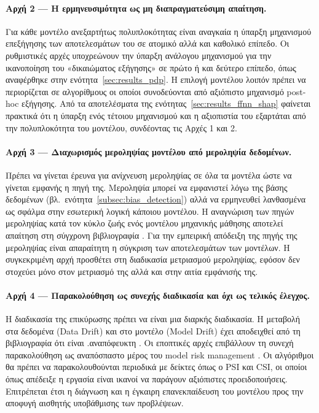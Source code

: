 \paragraph{Αρχή 2 --- Η ερμηνευσιμότητα ως μη διαπραγματεύσιμη απαίτηση.}
Για κάθε μοντέλο ανεξαρτήτως πολυπλοκότητας είναι αναγκαία η
ύπαρξη μηχανισμού επεξήγησης των αποτελεσμάτων του σε ατομικό
αλλά και καθολικό επίπεδο. Οι ρυθμιστικές αρχές υποχρεώνουν
την ύπαρξη ανάλογου μηχανισμού για την ικανοποίηση του
«δικαιώματος εξήγησης» \citep{goodman2017european, eba2023} σε πρώτο ή και δεύτερο επίπεδο, όπως
αναφέρθηκε στην ενότητα~\ref{sec:results_pdp}. Η επιλογή
μοντέλου λοιπόν πρέπει να περιορίζεται σε αλγορίθμους οι οποίοι
συνοδεύονται από αξιόπιστο μηχανισμό post-hoc εξήγησης. Από τα
αποτελέσματα της ενότητας~\ref{sec:results_ffnn_shap} φαίνεται
πρακτικά ότι η ύπαρξη ενός τέτοιου μηχανισμού και η αξιοπιστία
του εξαρτάται από την πολυπλοκότητα του μοντέλου, συνδέοντας
τις Αρχές 1 και 2.

\paragraph{Αρχή 3 --- Διαχωρισμός μεροληψίας μοντέλου από μεροληψία δεδομένων.}
Πρέπει να γίνεται έρευνα για ανίχνευση μεροληψίας σε όλα τα
μοντέλα ώστε να γίνεται εμφανής η πηγή της. Μεροληψία μπορεί
να εμφανιστεί λόγω της βάσης δεδομένων
(βλ.\ ενότητα~\ref{subsec:bias_detection}) αλλά να ερμηνευθεί
λανθασμένα ως σφάλμα στην εσωτερική λογική κάποιου μοντέλου.
Η αναγνώριση των πηγών μεροληψίας κατά τον κύκλο ζωής ενός μοντέλου μηχανικής μάθησης 
αποτελεί απαίτηση στη σύγχρονη βιβλιογραφία \citep{mehrabi2021survey, suresh2021framework}.
Για την εμπειρική απόδειξη της πηγής της μεροληψίας είναι
απαραίτητη η σύγκριση των αποτελεσμάτων των μοντέλων. Η
συγκεκριμένη αρχή προσθέτει στη διαδικασία μετριασμού
μεροληψίας, εφόσον δεν στοχεύει μόνο στον μετριασμό της αλλά
και στην αιτία εμφάνισής της.

\paragraph{Αρχή 4 --- Παρακολούθηση ως συνεχής διαδικασία και όχι ως τελικός έλεγχος.}
Η διαδικασία της επικύρωσης πρέπει να είναι μια διαρκής
διαδικασία. Η μεταβολή στα δεδομένα (Data Drift) και στο
μοντέλο (Model Drift) έχει αποδειχθεί από τη βιβλιογραφία ότι
είναι .αναπόφευκτη \citep{widmer1996learning, gama2014}. Οι 
εποπτικές αρχές επιβάλλουν τη συνεχή παρακολούθηση ως αναπόσπαστο 
μέρος του model risk management \citep{eba2023, sr117}. Οι αλγόριθμοι
θα πρέπει να παρακολουθούνται περιοδικά με δείκτες όπως ο PSI
και CSI, οι οποίοι όπως απέδειξε η εργασία είναι ικανοί να
παράγουν αξιόπιστες προειδοποιήσεις. Επιτρέπεται έτσι η
διάγνωση και η έγκαιρη επανεκπαίδευση του μοντέλου προς την
αποφυγή αισθητής υποβάθμισης των προβλέψεων.


